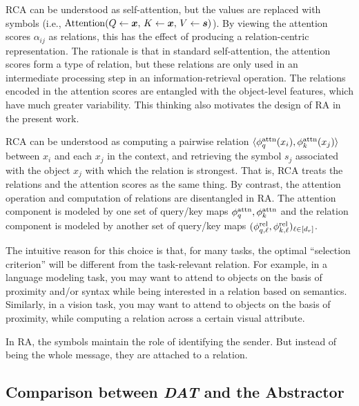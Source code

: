 RCA can be understood as self-attention, but the values are replaced with symbols (i.e., $\mathrm{Attention}(Q \gets \bm{x},\, K \gets \bm{x},\, V \gets \bm{s})$). By viewing the attention scores $\alpha_{ij}$ as relations, this has the effect of producing a relation-centric representation. The rationale is that in standard self-attention, the attention scores form a type of relation, but these relations are only used in an intermediate processing step in an information-retrieval operation. The relations encoded in the attention scores are entangled with the object-level features, which have much greater variability. This thinking also motivates the design of RA in the present work.

RCA can be understood as computing a pairwise relation $\langle \phi_q^{\mathrm{attn}}(x_i), \phi_k^{\mathrm{attn}}(x_j) \rangle$ between $x_i$ and each $x_j$ in the context, and retrieving the symbol $s_j$ associated with the object $x_j$ with which the relation is strongest. That is, RCA treats the relations and the attention scores as the same thing. By contrast, the attention operation and computation of relations are disentangled in RA. The attention component is modeled by one set of query/key maps $\phi_q^{\mathrm{attn}}, \phi_k^{\mathrm{attn}}$ and the relation component is modeled by another set of query/key maps $(\phi_{q, \ell}^{\mathrm{rel}}, \phi_{k, \ell}^{\mathrm{rel}})_{\ell \in [d_r]}$.

The intuitive reason for this choice is that, for many tasks, the optimal ``selection criterion'' will be different from the task-relevant relation. For example, in a language modeling task, you may want to attend to objects on the basis of proximity and/or syntax while being interested in a relation based on semantics. Similarly, in a vision task, you may want to attend to objects on the basis of proximity, while computing a relation across a certain visual attribute.

In RA, the symbols maintain the role of identifying the sender. But instead of being the whole message, they are attached to a relation.

\subsection{Comparison between \textit{DAT} and the Abstractor}

